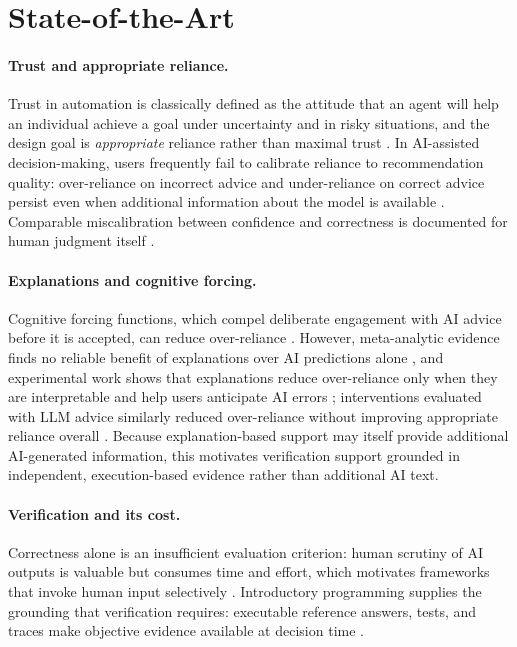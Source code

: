 \documentclass[oneside,final,14pt,a4paper]{extreport}
\begin{document}
\section{State-of-the-Art}

\paragraph{Trust and appropriate reliance.}
Trust in automation is classically defined as the attitude that an agent will
help an individual achieve a goal under uncertainty and in risky situations,
and the design goal is \emph{appropriate} reliance rather than maximal trust
\cite{LeeSee2004}. In AI-assisted decision-making, users frequently fail to
calibrate reliance to recommendation quality: over-reliance on incorrect
advice and under-reliance on correct advice persist even when additional
information about the model is available
\cite{PoursabziSangdeh2021,Chen2023}. Comparable miscalibration between
confidence and correctness is documented for human judgment itself
\cite{KrugerDunning1999}.

\paragraph{Explanations and cognitive forcing.}
Cognitive forcing functions, which compel deliberate engagement with AI
advice before it is accepted, can reduce over-reliance \cite{Bucinca2021}.
However, meta-analytic evidence finds no reliable benefit of explanations
over AI predictions alone \cite{Schemmer2022}, and experimental work shows
that explanations reduce over-reliance only when they are interpretable and
help users anticipate AI errors \cite{Vasconcelos2022}; interventions
evaluated with LLM advice similarly reduced over-reliance without improving
appropriate reliance overall \cite{Bo2025}. Because explanation-based
support may itself provide additional AI-generated information, this
motivates verification support grounded in independent, execution-based
evidence rather than additional AI text.

\paragraph{Verification and its cost.}
Correctness alone is an insufficient evaluation criterion: human scrutiny of
AI outputs is valuable but consumes time and effort, which motivates
frameworks that invoke human input selectively \cite{CascadedLM2025}.
Introductory programming supplies the grounding that verification requires:
executable reference answers, tests, and traces make objective evidence
available at decision time \cite{Zhang2024Verify}.
\end{document}
